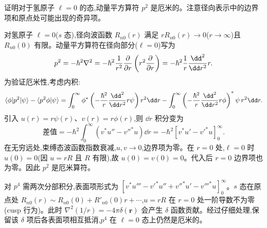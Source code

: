 \begin{question}
证明对于氢原子 $\ell=0$ 的态,动量平方算符 $p^2$ 是厄米的。注意径向表示中的边界项和原点处可能出现的奇异项。
\end{question}
\begin{solution}
对氢原子 $\ell=0$($s$ 态),径向波函数 $R_{n0}(r)$ 满足 $rR_{n0}(r)\to0$($r\to\infty$)且 $R_{n0}(0)$ 有限。动量平方算符在径向部分($\ell=0$)写为
\[
p^2=-\hbar^2\nabla^2=-\hbar^2{1\over r^2}{\partial\over\partial r}\left(r^2{\partial\over\partial r}\right)
=-\hbar^2{1\over r}{\dd^2\over\dd r^2}r.
\]
为验证厄米性,考虑内积:
\[
\langle\phi|p^2|\psi\rangle-\langle p^2\phi|\psi\rangle
=\int_0^\infty\phi^*\left(-{\hbar^2\over r}{\dd^2\over\dd r^2}r\psi\right)r^2\dd r
-\int_0^\infty\left(-{\hbar^2\over r}{\dd^2\over\dd r^2}r\phi\right)^*\psi\,r^2\dd r.
\]
引入 $u(r)=r\psi(r)$、$v(r)=r\phi(r)$,则 $\dd r$ 积分变为
\[
\text{差值}=-\hbar^2\int_0^\infty\left(v^*u''-v''^*u\right)\dd r
=-\hbar^2\left[v^*u'-v'^*u\right]_0^\infty.
\]
在无穷远处,束缚态波函数指数衰减,$u,v\to0$,边界项为零。在 $r=0$ 处,$\ell=0$ 时 $u(0)=0$(因 $u=rR$ 且 $R$ 有限),故 $u(0)=v(0)=0$。代入后 $r=0$ 边界项也为零。因此 $p^2$ 是厄米算符。

对 $p^4$ 需两次分部积分,表面项形式为 $[v^*u'''-v'^*u''+v''^*u'-v'''^*u]_0^\infty$。$s$ 态在原点处 $R_{n0}(r)\sim R_{n0}(0)+R'_{n0}(0)r+\cdots$,$u=rR$ 在 $r=0$ 处一阶导数不为零(cusp 行为)。此时 $\nabla^2(1/r)=-4\pi\delta(\mathbf r)$ 会产生 $\delta$ 函数贡献。经过仔细处理,保留该 $\delta$ 项后各表面项相互抵消,$p^4$ 在 $\ell=0$ 态上仍然是厄米的。
\end{solution}

